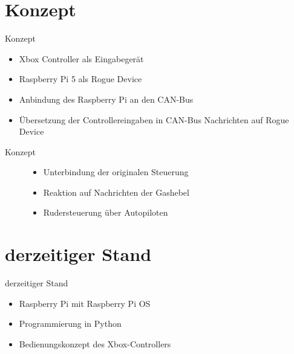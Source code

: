 \documentclass[usenames, dvipsnames, aspectratio=75]{beamer}
\begin{document}

\section{Konzept}
\begin{frame}{Konzept}
    \begin{itemize}
        \item Xbox Controller als Eingabegerät
        \item Raspberry Pi 5 als Rogue Device
        \item Anbindung des Raspberry Pi an den CAN-Bus
        \item Übersetzung der Controllereingaben in CAN-Bus Nachrichten auf Rogue Device
    \end{itemize}
\end{frame}

\begin{frame}{Konzept}
    \begin{figure}
        \begin{itemize}
            \item Unterbindung der originalen Steuerung
            \item Reaktion auf Nachrichten der Gashebel
            \item Rudersteuerung über Autopiloten
        \end{itemize}
    \end{figure}
\end{frame}

\section{derzeitiger Stand}

\begin{frame}{derzeitiger Stand}
    \begin{itemize}
        \item Raspberry Pi mit Raspberry Pi OS
        \item Programmierung in Python
        \item Bedienungskonzept des Xbox-Controllers
    \end{itemize}
\end{frame}
\end{document}
